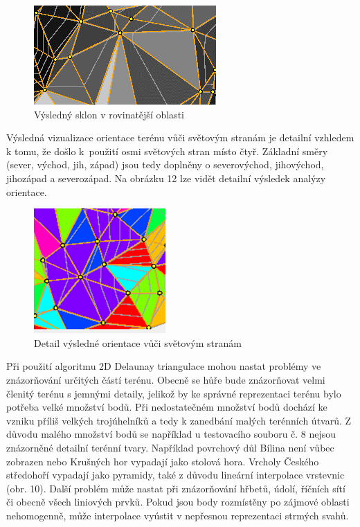 \documentclass{article}
\begin{document}
\begin{spacing}{1.5}
\begin{figure}[htbp]
    \centering
    \includegraphics[width=0.3\linewidth]{images/11sklon.png}
    \caption{Výsledný sklon v rovinatější oblasti}
    \label{fig:enter-label}
\end{figure}

\newpage
Výsledná vizualizace orientace terénu vůči světovým stranám je detailní vzhledem k tomu, že došlo k~použití osmi světových stran místo čtyř.  Základní směry (sever, východ, jih, západ) jsou tedy doplněny o severovýchod, jihovýchod, jihozápad a severozápad. Na obrázku 12 lze vidět detailní výsledek analýzy orientace. 

\begin{figure}[htbp]
    \centering
    \includegraphics[width=0.3\linewidth]{images/12orientace.png}
    \caption{Detail výsledné orientace vůči světovým stranám}
    \label{fig:enter-label}
\end{figure}

Při použití algoritmu 2D Delaunay triangulace mohou nastat problémy ve znázorňování určitých částí terénu. Obecně se hůře bude znázorňovat velmi členitý terénu s jemnými detaily, jelikož by ke správné reprezentaci terénu bylo potřeba velké množství bodů. Při nedostatečném množství bodů dochází ke vzniku příliš velkých trojúhelníků a tedy k zanedbání malých terénních útvarů. Z důvodu malého množství bodů se například u testovacího souboru č. 8 nejsou znázorněné detailní terénní tvary. Například povrchový důl Bílina není vůbec zobrazen nebo Krušných hor vypadají jako stolová hora. Vrcholy Českého středohoří vypadají jako pyramidy, také z důvodu lineární interpolace vrstevnic (obr. 10). Další problém může nastat při znázorňování hřbetů, údolí, říčních sítí či obecně všech liniových prvků. Pokud jsou body rozmístěny po zájmové oblasti nehomogenně, může interpolace vyústit v nepřesnou reprezentaci strmých svahů. 


\end{spacing}
\end{document}
